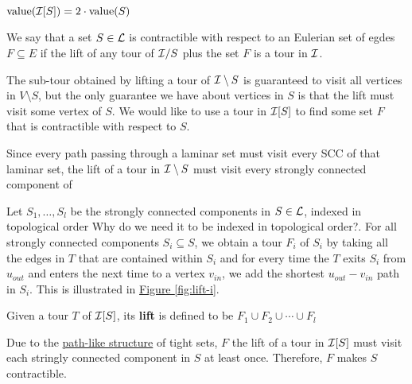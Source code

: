 \documentclass[./main.tex]{subfiles}
\begin{document}
	\begin{fact}
		$\textup{value}(\mathcal{I}[S]) = 2\cdot\textup{value}(S)$
	\end{fact}

	\begin{definition}
		We say that a set $S \in \mathcal{L}$ is contractible with respect to an Eulerian set of egdes $F \subseteq E$ if the lift of any tour of $\mathcal{I}/S$ plus the set $F$ is a tour in $\mathcal{I}$.\\
	\end{definition}

	The sub-tour obtained by lifting a tour of $\mathcal{I}\setminus S$ is guaranteed to visit all vertices in $V\setminus S$, but the only guarantee we have about vertices in $S$ is that the lift must visit some vertex of $S$. We would like to use a tour in $\mathcal{I}[S]$ to find some set $F$ that is contractible with respect to $S$.

	Since every path passing through a laminar set must visit every SCC of that laminar set, the lift of a tour in $\mathcal{I}\setminus S$ must visit every strongly connected component of

	Let $S_1, \dots, S_l$ be the strongly connected components in $S \in \mathcal{L}$, indexed in topological order{\color{red} Why do we need it to be indexed in topological order?}. For all strongly connected components $S_i \subseteq S$, we obtain a tour $F_i$ of $S_i$ by taking all the edges in $T$ that are contained within $S_i$ and for every time the $T$ exits $S_i$ from $u_{out}$ and enters the next time to a vertex $v_{in}$, we add the shortest $u_{out} - v_{in}$ path in $S_i$.
	This is illustrated in \hyperref[fig:lift-i]{Figure \ref{fig:lift-i}}.
	\vspace{2mm}
	
	\begin{definition}\label{def:3:indu-lift}
		Given a tour $T$ of $\mathcal{I}[S]$, its \textbf{lift} is defined to be $F_1\cup F_2\cup\cdots\cup F_l$
	\end{definition}




	Due to the \hyperref[fig:tightPath]{path-like structure} of tight sets, $F$ the lift of a tour in $\mathcal{I}[S]$ must visit each stringly connected component in $S$ at least once. Therefore, $F$ makes $S$ contractible.\\
	
\end{document}
